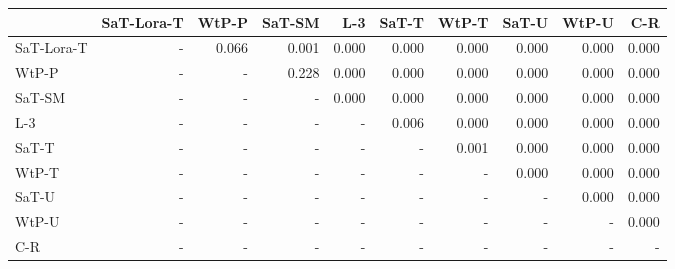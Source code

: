 \begin{tabular}{lrrrrrrrrr}
\toprule
 & SaT-Lora-T & WtP-P & SaT-SM & L-3 & SaT-T & WtP-T & SaT-U & WtP-U & C-R \\
\midrule
SaT-Lora-T & - & 0.066 & 0.001 & 0.000 & 0.000 & 0.000 & 0.000 & 0.000 & 0.000 \\
WtP-P & - & - & 0.228 & 0.000 & 0.000 & 0.000 & 0.000 & 0.000 & 0.000 \\
SaT-SM & - & - & - & 0.000 & 0.000 & 0.000 & 0.000 & 0.000 & 0.000 \\
L-3 & - & - & - & - & 0.006 & 0.000 & 0.000 & 0.000 & 0.000 \\
SaT-T & - & - & - & - & - & 0.001 & 0.000 & 0.000 & 0.000 \\
WtP-T & - & - & - & - & - & - & 0.000 & 0.000 & 0.000 \\
SaT-U & - & - & - & - & - & - & - & 0.000 & 0.000 \\
WtP-U & - & - & - & - & - & - & - & - & 0.000 \\
C-R & - & - & - & - & - & - & - & - & - \\
\bottomrule
\end{tabular}

